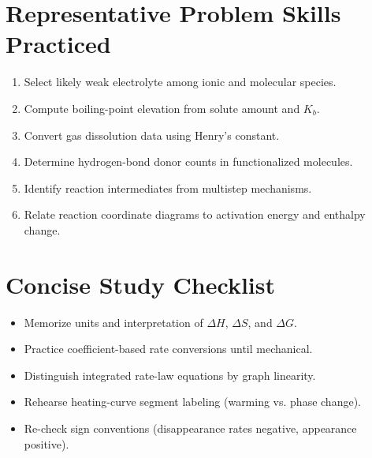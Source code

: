 \documentclass[11pt]{article}
\begin{document}
\section*{Representative Problem Skills Practiced}
\begin{enumerate}[leftmargin=*]
  \item Select likely weak electrolyte among ionic and molecular species.
  \item Compute boiling-point elevation from solute amount and $K_b$.
  \item Convert gas dissolution data using Henry's constant.
  \item Determine hydrogen-bond donor counts in functionalized molecules.
  \item Identify reaction intermediates from multistep mechanisms.
  \item Relate reaction coordinate diagrams to activation energy and enthalpy change.
\end{enumerate}

\section*{Concise Study Checklist}
\begin{itemize}[leftmargin=*]
  \item Memorize units and interpretation of $\Delta H$, $\Delta S$, and $\Delta G$.
  \item Practice coefficient-based rate conversions until mechanical.
  \item Distinguish integrated rate-law equations by graph linearity.
  \item Rehearse heating-curve segment labeling (warming vs. phase change).
  \item Re-check sign conventions (disappearance rates negative, appearance positive).
\end{itemize}
\end{document}
